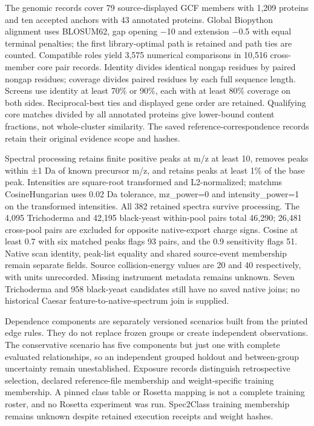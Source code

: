 \documentclass[
  10pt,
  a4paper,
]{article}
\begin{document}
The genomic records cover 79 source-displayed GCF members with 1,209 proteins and ten accepted anchors with 43 annotated proteins. Global Biopython alignment uses BLOSUM62, gap opening −10 and extension −0.5 with equal terminal penalties; the first library-optimal path is retained and path ties are counted. Compatible roles yield 3,575 numerical comparisons in 10,516 cross-member core pair records. Identity divides identical nongap residues by paired nongap residues; coverage divides paired residues by each full sequence length. Screens use identity at least 70\% or 90\%, each with at least 80\% coverage on both sides. Reciprocal-best ties and displayed gene order are retained. Qualifying core matches divided by all annotated proteins give lower-bound content fractions, not whole-cluster similarity. The saved reference-correspondence records retain their original evidence scope and hashes.

Spectral processing retains finite positive peaks at m/z at least 10, removes peaks within ±1 Da of known precursor m/z, and retains peaks at least 1\% of the base peak. Intensities are square-root transformed and L2-normalized; matchms CosineHungarian uses 0.02 Da tolerance, mz\_power=0 and intensity\_power=1 on the transformed intensities. All 382 retained spectra survive processing. The 4,095 Trichoderma and 42,195 black-yeast within-pool pairs total 46,290; 26,481 cross-pool pairs are excluded for opposite native-export charge signs. Cosine at least 0.7 with six matched peaks flags 93 pairs, and the 0.9 sensitivity flags 51. Native scan identity, peak-list equality and shared source-event membership remain separate fields. Source collision-energy values are 20 and 40 respectively, with units unrecorded. Missing instrument metadata remains unknown. Seven Trichoderma and 958 black-yeast candidates still have no saved native joins; no historical Caesar feature-to-native-spectrum join is supplied.

Dependence components are separately versioned scenarios built from the printed edge rules. They do not replace frozen groups or create independent observations. The conservative scenario has five components but just one with complete evaluated relationships, so an independent grouped holdout and between-group uncertainty remain unestablished. Exposure records distinguish retrospective selection, declared reference-file membership and weight-specific training membership. A pinned class table or Rosetta mapping is not a complete training roster, and no Rosetta experiment was run. Spec2Class training membership remains unknown despite retained execution receipts and weight hashes.
\end{document}
